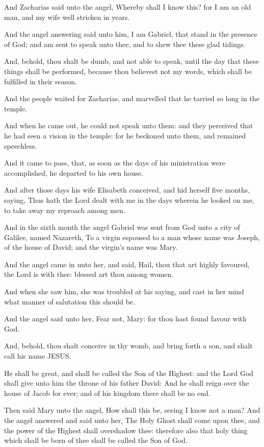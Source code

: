 \Verse And Zacharias said unto the angel, Whereby shall I know this? for I am an old man, and my wife well stricken in years.

\Verse And the angel answering said unto him, I am Gabriel, that stand in the presence of God; and am sent to speak unto thee, and to shew thee these glad tidings.

\Verse And, behold, thou shalt be dumb, and not able to speak, until the day that these things shall be performed, because thou believest not my words, which shall be fulfilled in their season.

\Verse And the people waited for Zacharias, and marvelled that he tarried so long in the temple.

\Verse And when he came out, he could not speak unto them: and they perceived that he had seen a vision in the temple: for he beckoned unto them, and remained speechless.

\Verse And it came to pass, that, as soon as the days of his ministration were accomplished, he departed to his own house.

\Verse And after those days his wife Elisabeth conceived, and hid herself five months, saying, \Verse Thus hath the Lord dealt with me in the days wherein he looked on me, to take away my reproach among men.

\Verse And in the sixth month the angel Gabriel was sent from God unto a city of Galilee, named Nazareth, \Verse To a virgin espoused to a man whose name was Joseph, of the house of David; and the virgin's name was Mary.

\Verse And the angel came in unto her, and said, Hail, thou that art highly favoured, the Lord is with thee: blessed art thou among women.

\Verse And when she saw him, she was troubled at his saying, and cast in her mind what manner of salutation this should be.

\Verse And the angel said unto her, Fear not, Mary: for thou hast found favour with God.

\Verse And, behold, thou shalt conceive in thy womb, and bring forth a son, and shalt call his name JESUS.

\Verse He shall be great, and shall be called the Son of the Highest: and the Lord God shall give unto him the throne of his father David: \Verse And he shall reign over the house of Jacob for ever; and of his kingdom there shall be no end.

\Verse Then said Mary unto the angel, How shall this be, seeing I know not a man?  \Verse And the angel answered and said unto her, The Holy Ghost shall come upon thee, and the power of the Highest shall overshadow thee: therefore also that holy thing which shall be born of thee shall be called the Son of God.

